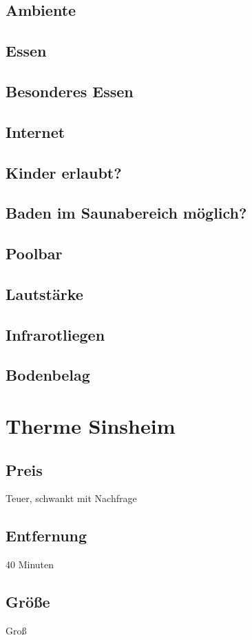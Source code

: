 \documentclass{article}
\begin{document}
\subsection*{Ambiente}
\subsection*{Essen}
\subsection*{Besonderes Essen}
\subsection*{Internet}
\subsection*{Kinder erlaubt?}
\subsection*{Baden im Saunabereich möglich?}
\subsection*{Poolbar}
\subsection*{Lautstärke}
\subsection*{Infrarotliegen}
\subsection*{Bodenbelag}
\pagebreak

\section*{Therme Sinsheim}
\subsection*{Preis} Teuer, schwankt mit Nachfrage
\subsection*{Entfernung} 40 Minuten
\subsection*{Größe} Groß
\end{document}
